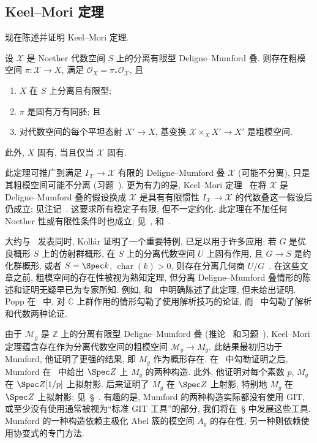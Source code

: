 \subsection{Keel--Mori 定理}\label{src:5.4.2-subsection}
现在陈述并证明 Keel--Mori 定理.
\begin{theorem}\label{src:5.4.6}
设 $\mathcal X$ 是 Noether 代数空间 $S$ 上的分离有限型 Deligne--Mumford 叠. 则存在粗模空间 $\pi:\mathcal X\to X$, 满足 $\mathcal O_X=\pi_*\mathcal O_{\mathcal X}$, 且
\begin{enumerate}[(1)]
\item $X$ 在 $S$ 上分离且有限型;
\item $\pi$ 是固有万有同胚; 且
\item 对代数空间的每个平坦态射 $X'\to X$, 基变换 $\mathcal X\times_X X'\to X'$ 是粗模空间.
\end{enumerate}
此外, $X$ 固有, 当且仅当 $\mathcal X$ 固有.
\end{theorem}
此定理可推广到满足 $I_{\mathcal X}\to\mathcal X$ 有限的 Deligne--Mumford 叠 $\mathcal X$ (可能不分离), 只是其粗模空间可能不分离 (习题~). 更为有力的是, Keel--Mori 定理~\cite{KM97} 在将 $\mathcal X$ 是 Deligne--Mumford 叠的假设换成 $\mathcal X$ 是具有有限惯性 $I_{\mathcal X}\to\mathcal X$ 的代数叠这一假设后仍成立; 见注记~. 这要求所有稳定子有限, 但不一定约化. 此定理在不加任何 Noether 性或有限性条件时也成立; 见~\cite{Con05b}, \cite{Ryd13} 和~\cite[Tag 0DUK]{SP}.
\begin{remark}[历史注记]\label{src:5.4.7}
大约与~\cite{KM97} 发表同时, Kollár 证明了一个重要特例, 已足以用于许多应用: 若 $G$ 是优良概形 $S$ 上的仿射群概形, 在 $S$ 上的分离代数空间 $U$ 上固有作用, 且 $G\to S$ 是约化群概形, 或者 $S=\Spec k$, $\operatorname{char}(k)>0$, 则存在分离几何商 $U/G$~\cite[定理 $1.5$]{Kol97}. 在这些文章之前, 粗模空间的存在性被视为熟知定理, 但分离 Deligne--Mumford 叠情形的陈述和证明无疑早已为专家所知. 例如, \cite[定理 I.4.10]{FC90} 和~\cite[定理 $2.2$]{Kol90} 中明确陈述了此定理, 但未给出证明. Popp 在~\cite[第 $55$ 页的定理]{Pop74} 中, 对 $\mathbb C$ 上群作用的情形勾勒了使用解析技巧的论证, 而~\cite[\S$5$.A]{MF82} 中勾勒了解析和代数两种论证.

由于 $\mathcal M_g$ 是 $\mathbb Z$ 上的分离有限型 Deligne--Mumford 叠 (推论~ 和习题~), Keel--Mori 定理蕴含存在作为分离代数空间的粗模空间 $\mathcal M_g\to M_g$. 此结果最初归功于 Mumford, 他证明了更强的结果, 即 $M_g$ 作为概形存在. 在~\cite{Mum61} 中勾勒证明之后, Mumford 在~\cite[定理 $5.11$ 和 $7.13$]{GIT} 中给出 $\Spec\mathbb Z$ 上 $M_g$ 的两种构造. 此外, 他证明对每个素数 $p$, $M_g$ 在 $\Spec\mathbb Z[1/p]$ 上拟射影. 后来证明了 $\overline M_g$ 在 $\Spec\mathbb Z$ 上射影, 特别地 $M_g$ 在 $\Spec\mathbb Z$ 上拟射影; 见~\S{}--. 有趣的是, Mumford 的两种构造实际都没有使用 GIT, 或至少没有使用通常被视为``标准 GIT 工具''的部分, 我们将在~\S{} 中发展这些工具. Mumford 的一种构造依赖主极化 Abel 簇的模空间 $A_g$ 的存在性, 另一种则依赖使用协变式的专门方法.
\end{remark}

